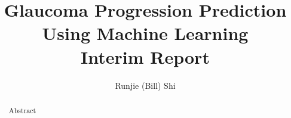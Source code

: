 \documentclass{ut-thesis}
\author{Runjie (Bill) Shi}
\title{Glaucoma Progression Prediction Using Machine Learning 
	\\
	Interim Report}
\begin{document}
\begin{preliminary}

\maketitle


\begin{abstract}
Abstract
\end{abstract}







\end{preliminary}
\end{document}
